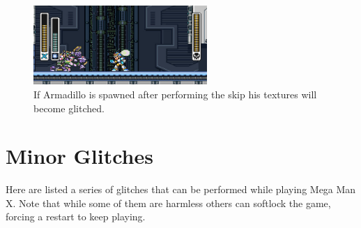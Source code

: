 \begin{figure}[htp]
	\centering
	\includegraphics[height=3cm]{figures/X1/Miscs/Dillo_glitch.jpg}
	\caption{If Armadillo is spawned after performing the skip his textures will become glitched.}
\end{figure}

\section{Minor Glitches}
Here are listed a series of glitches that can be performed while playing Mega Man X. Note that while some of them are harmless others can softlock the game, forcing a restart to keep playing.
